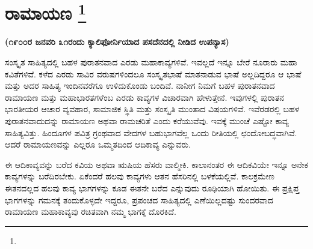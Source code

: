 
\chapter[ರಾಮಾಯಣ ]{ರಾಮಾಯಣ \protect\footnote{}}

\begin{flushright}
\textbf{(೧೯೦೦ರ ಜನವರಿ ೩೧ರಂದು ಕ್ಯಾಲಿಫೋರ್ನಿಯಾದ ಪಸದೆನದಲ್ಲಿ ನೀಡಿದ ಉಪನ್ಯಾಸ)}
\end{flushright}

ಸಂಸ್ಕೃತ ಸಾಹಿತ್ಯದಲ್ಲಿ ಬಹಳ ಪುರಾತನವಾದ ಎರಡು ಮಹಾಕಾವ್ಯಗಳಿವೆ. ಇವಲ್ಲದೆ ಇನ್ನೂ ಬೇರೆ ನೂರಾರು ಮಹಾ ಕವಿತೆಗಳಿವೆ. ಕಳೆದ ಎರಡು ಸಾವಿರ ವರುಷಗಳಿಂದಲೂ ಸಂಸ್ಕೃತಭಾಷೆ ಮಾತನಾಡುವ ಭಾಷೆ ಅಲ್ಲದಿದ್ದರೂ ಆ ಭಾಷೆ ಮತ್ತು ಅದರ ಸಾಹಿತ್ಯ ಇಂದಿನವರೆಗೂ ಉಳಿದುಕೊಂಡು ಬಂದಿವೆ. ನಾನೀಗ ನಿಮಗೆ ಬಹಳ ಪುರಾತನವಾದ ರಾಮಾಯಣ ಮತ್ತು ಮಹಾಭಾರತಗಳೆಂಬ ಎರಡು ಕಾವ್ಯಗಳ ವಿಚಾರವಾಗಿ ಹೇಳುತ್ತೇನೆ. ಇವುಗಳಲ್ಲಿ ಪುರಾತನ ಭಾರತೀಯರ ಆಚಾರ ವ್ಯವಹಾರ, ಸಾಮಾಜಿಕ ಸ್ಥಿತಿ ಮತ್ತು ಸಂಸ್ಕೃತಿ ಮುಂತಾದ ವಿಷಯಗಳಿವೆ. ಇವೆರಡರಲ್ಲಿ ಬಹಳ ಪುರಾತನವಾದುದನ್ನು ರಾಮಾಯಣ ಅಥವಾ ರಾಮಚರಿತೆ ಎಂದು ಕರೆಯುವೆವು. ಇವಕ್ಕೆ ಮುಂಚೆ ಎಷ್ಟೋ ಕಾವ್ಯ ಸಾಹಿತ್ಯವಿತ್ತು. ಹಿಂದೂಗಳ ಪವಿತ್ರ ಗ್ರಂಥವಾದ ವೇದಗಳ ಬಹುಭಾಗವೆಲ್ಲ ಒಂದು ರೀತಿಯಲ್ಲಿ ಛಂದೋಬದ್ಧವಾಗಿವೆ. ಆದರೆ ರಾಮಾಯಣವನ್ನು ಎಲ್ಲರೂ ಒಮ್ಮತದಿಂದ ಆದಿಕಾವ್ಯ ಎನ್ನುವರು.

ಈ ಆದಿಕಾವ್ಯವನ್ನು ಬರೆದ ಕವಿಯ ಅಥವಾ ಋಷಿಯ ಹೆಸರು ವಾಲ್ಮೀಕಿ. ಕಾಲಾನಂತರ ಈ ಆದಿಕವಿಯೇ ಇನ್ನೂ ಅನೇಕ ಕಾವ್ಯಗಳನ್ನು ಬರೆದಿರಬೇಕು. ಏಕೆಂದರೆ ಹಲವು ಕಾವ್ಯಗಳು ಆತನ ಹೆಸರಿನಲ್ಲಿ ಬಳಕೆಯಲ್ಲಿವೆ. ಕಾಲಕ್ರಮೇಣ ಈತನದಲ್ಲದ ಹಲವು ಕಾವ್ಯ ಭಾಗಗಳನ್ನು ಕೂಡ ಈತನೇ ಬರೆದ ಎನ್ನುವುದು ರೂಢಿಯಾಗಿ ಹೋಯಿತು. ಈ ಪ್ರಕ್ಷಿಪ್ತ ಭಾಗಗಳನ್ನು ಗಮನಕ್ಕೆ ತಂದುಕೊಳ್ಳದೇ ಇದ್ದರೂ, ಪ್ರಪಂಚದ ಸಾಹಿತ್ಯದಲ್ಲಿ ಎಣೆಯಿಲ್ಲದಷ್ಟು ಸುಂದರವಾದ ರಾಮಾಯಣ ಮಹಾಕಾವ್ಯವು ರಚಿತವಾಗಿ ನಮ್ಮ ಭಾಗಕ್ಕೆ ದೊರಕಿದೆ.

